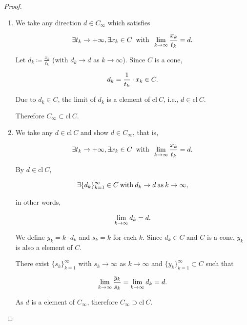 \documentclass[a4paper,11pt]{jsarticle}
\begin{document}
\begin{proof}
\begin{enumerate}[label=\roman*,align=CenterWithParen]
    \begin{enumerate}[label=iii-\alph*,align=CenterWithParen2]
      \item We take any direction $d \in C_{\infty}$ which satisfies

      \begin{equation}
        \exists t_k \rightarrow + \infty , \exists x_k \in C \:\text{ with }\: \lim_{k \to \infty} \frac{x_k}{t_k} = d. \notag
      \end{equation}

      Let $d_k \coloneqq \frac{x_k}{t_k}$ (with $d_k \rightarrow d$ as $k \rightarrow \infty$). Since $C$ is a cone,

      \begin{equation}
        d_k = \frac{1}{t_k} \cdot x_k \in C. \notag
      \end{equation}

      Due to $d_k \in C$, the limit of $d_k$ is a element of $\text{cl}\:C$, i.e., $d \in \text{cl}\:C$.

      Therefore $C_{\infty} \subset \text{cl}\:C$.

      \item We take any $d \in \text{cl}\:C$ and show $d \in C_{\infty}$, that is,

      \begin{equation}
        \exists t_k \rightarrow + \infty , \exists x_k \in C \:\text{ with }\: \lim_{k \to \infty} \frac{x_k}{t_k} = d. \notag
      \end{equation}

      By $d \in \text{cl}\:C$,

      \begin{equation}
        \exists \{d_k\}_{k=1}^{\infty} \in C \:\text{with}\: d_k \rightarrow d \:\text{as}\: k \rightarrow \infty, \notag
      \end{equation}

      in other words,

      \begin{equation}
        \lim_{k \to \infty} d_k = d. \notag
      \end{equation}

      We define $y_k = k \cdot d_k$ and $s_k = k$ for each $k$. Since $d_k \in C$ and $C$ is a cone, $y_k$ is also a element of $C$.

      There exist $\{s_k\}_{k=1}^{\infty}$ with $s_k \rightarrow \infty$ as $k \rightarrow \infty$ and $\{y_k\}_{k=1}^{\infty} \subset C$ such that

      \begin{equation}
        \lim_{k \to \infty} \frac{y_k}{s_k} = \lim_{k \to \infty} d_k = d. \notag
      \end{equation}

      As $d$ is a element of $C_{\infty}$, therefore $C_{\infty} \supset  \text{cl}\:C$.

    \end{enumerate}

  \end{enumerate}
\end{proof}
\end{document}
